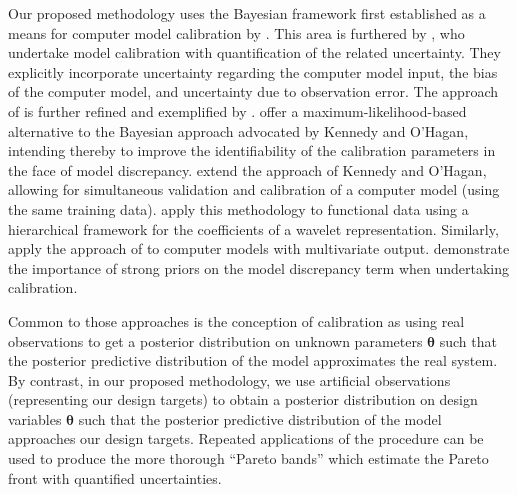 \documentclass[12pt]{article}
\begin{document}
%
Our proposed methodology uses the Bayesian framework first established as a means for computer model calibration by \cite{Kennedy2001}.
% 
This area is furthered by \cite{Higdon2004}, who undertake model calibration with quantification of the related uncertainty. 
They explicitly incorporate uncertainty regarding the computer model input, the bias of the computer model, and uncertainty due to observation error. 
%
The approach of \cite{Higdon2004} is further refined and exemplified by \cite{Williams2006}.
%
\cite{Loeppky2006} offer a maximum-likelihood-based alternative to the Bayesian approach advocated by Kennedy and O'Hagan, intending thereby to improve the identifiability of the calibration parameters in the face of model discrepancy. 
%
\cite{Bayarri2007} extend the approach of Kennedy and O'Hagan, allowing for simultaneous validation and calibration of a computer model (using the same training data). 
%
\cite{Bayarri} apply this methodology to functional data using a hierarchical framework for the coefficients of a wavelet representation. 
%
Similarly, \cite{Paulo2012} apply the approach of \cite{Bayarri2007} to computer models with multivariate output.
%
\cite{Brynjarsdottir2014} demonstrate the importance of strong priors on the model discrepancy term when undertaking calibration.
%

%
Common to those approaches is the conception of calibration as using real observations to get a posterior distribution on unknown parameters $\boldsymbol\theta$ such that the posterior predictive distribution of the model approximates the real system.
%
By contrast, in our proposed methodology, we use artificial observations (representing our design targets) to obtain a posterior distribution on design variables $\boldsymbol\theta$ such that the posterior predictive distribution of the model approaches our design targets.
%
%
Repeated applications of the procedure can be used to produce the more thorough ``Pareto bands'' which estimate the Pareto front with quantified uncertainties.
%
\end{document}
